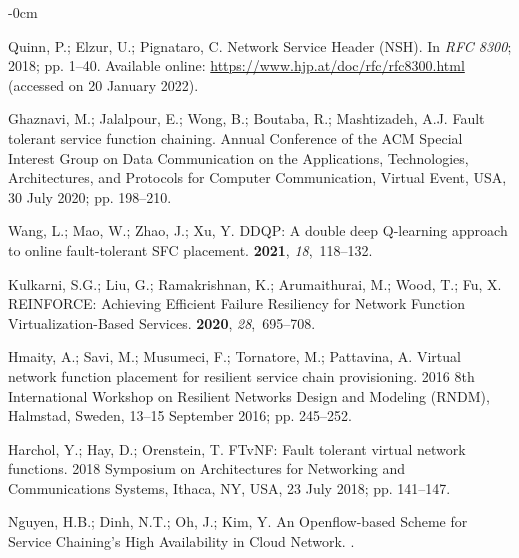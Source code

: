 \documentclass[futureinternet,review,accept,pdftex,moreauthors]{Definitions/mdpi}
\begin{document}
\begin{adjustwidth}{-\extralength}{0cm}
\begin{thebibliography}{999}
Quinn, P.; Elzur, U.; Pignataro, C.
\newblock Network Service Header (NSH). In {\em RFC 8300};  2018;
  pp. {1}--40. \newblock  Available online: \url{https://www.hjp.at/doc/rfc/rfc8300.html}{ (accessed on 20 January 2022).}

Ghaznavi, M.; Jalalpour, E.; Wong, B.; Boutaba, R.; Mashtizadeh, A.J.
\newblock Fault tolerant service function chaining.
 Annual Conference of the ACM Special Interest
  Group on Data Communication on the Applications, Technologies, Architectures,
  and Protocols for Computer Communication,  Virtual Event, USA, 30 July 2020; pp. 198--210.

Wang, L.; Mao, W.; Zhao, J.; Xu, Y.
\newblock DDQP: A double deep Q-learning approach to online fault-tolerant SFC
  placement.
 {\bf 2021},
  {\em 18},~118--132.

Kulkarni, S.G.; Liu, G.; Ramakrishnan, K.; Arumaithurai, M.; Wood, T.; Fu, X.
\newblock REINFORCE: Achieving Efficient Failure Resiliency for Network
  Function Virtualization-Based Services.
 {\bf 2020}, {\em
  28},~695--708.

Hmaity, A.; Savi, M.; Musumeci, F.; Tornatore, M.; Pattavina, A.
\newblock Virtual network function placement for resilient service chain
  provisioning.
 2016 8th International Workshop on Resilient Networks Design and
  Modeling (RNDM),  Halmstad, Sweden,  13--15 September 2016; pp. 245--252.

Harchol, Y.; Hay, D.; Orenstein, T.
\newblock FTvNF: Fault tolerant virtual network functions.
 2018 Symposium on Architectures for Networking
  and Communications Systems,  Ithaca, NY, USA, 23 July 2018; pp. 141--147.

Nguyen, H.B.; Dinh, N.T.; Oh, J.; Kim, Y.
\newblock An Openflow-based Scheme for Service Chaining's High Availability in
  Cloud Network.
.


\end{thebibliography}
\end{adjustwidth}
\end{document}
